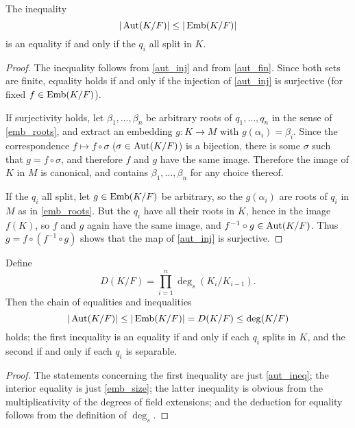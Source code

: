 \begin{proposition} The inequality
\begin{equation*}
|\operatorname{\text{Aut}}(K/F)| \leq |\operatorname{\text{Emb}}(K/F)|
\end{equation*}
is an equality if and only if the $q_i$ all split in $K$.
\label{aut_ineq}
\end{proposition}

\begin{proof} The inequality follows from \cref{aut_inj} and from \cref{aut_fin}.
Since both sets are finite, equality holds if and only if the injection of
\cref{aut_inj} is surjective (for fixed $f \in \operatorname{\text{Emb}}(K/F)$).

If surjectivity holds, let $\beta_1, \dots, \beta_n$ be arbitrary roots of
$q_1, \dots, q_n$ in the sense of \cref{emb_roots}, and extract an embedding $g
\colon K \to M$ with $g(\alpha_i) = \beta_i$.  Since the correspondence $f
\mapsto f \circ \sigma$ ($\sigma \in \operatorname{\text{Aut}}(K/F)$) is a bijection, there is some
$\sigma$ such that $g = f \circ \sigma$, and therefore $f$ and $g$ have the
same image.  Therefore the image of $K$ in $M$ is canonical, and contains
$\beta_1, \dots, \beta_n$ for any choice thereof.

If the $q_i$ all split, let $g \in \operatorname{\text{Emb}}(K/F)$ be arbitrary, so the
$g(\alpha_i)$ are roots of $q_i$ in $M$ as in \cref{emb_roots}.  But the $q_i$
have all their roots in $K$, hence in the image $f(K)$, so $f$ and $g$ again
have the same image, and $f^{-1} \circ g \in \operatorname{\text{Aut}}(K/F)$.  Thus $g = f \circ
(f^{-1} \circ g)$ shows that the map of \cref{aut_inj} is surjective.
\end{proof}

\begin{corollary} Define
\begin{equation*}
D(K/F) = \prod_{i = 1}^n \deg_s(K_i/K_{i - 1}).
\end{equation*}
Then the chain of equalities and inequalities
\begin{equation*}
|\operatorname{\text{Aut}}(K/F)| \leq |\operatorname{\text{Emb}}(K/F)| = D(K/F) \leq \deg(K/F)
\end{equation*}
holds; the first inequality is an equality if and only if each $q_i$ splits in
$K$, and the second if and only if each $q_i$ is separable.
\label{large_aut_ineq}
\end{corollary}

\begin{proof} The statements concerning the first inequality are just
\cref{aut_ineq}; the interior equality is just \cref{emb_size}; the latter
inequality is obvious from the multiplicativity of the degrees of field
extensions; and the deduction for equality follows from the definition of
$\deg_s$. \end{proof}

